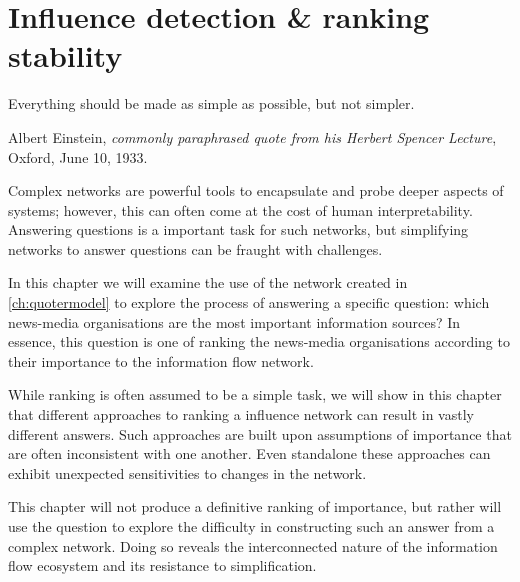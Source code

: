 \chapter{Influence detection \& ranking stability }\label{ch:ranking}


\epigraph{Everything should be made as simple as possible, but not simpler.}{Albert Einstein, {\em commonly paraphrased quote from his Herbert Spencer Lecture}, Oxford, June 10, 1933.}

Complex networks are powerful tools to encapsulate and probe deeper aspects of systems; however, this can often come at the cost of human interpretability. Answering questions is a important task for such networks, but simplifying networks to answer questions can be fraught with challenges.

In this chapter we will examine the use of the network created in \autoref{ch:quotermodel} to explore the process of answering a specific question: which news-media organisations are the most important information sources? In essence, this question is one of ranking the news-media organisations according to their importance to the information flow network. 

While ranking is often assumed to be a simple task, we will show in this chapter that different approaches to ranking a influence network can result in vastly different answers. Such approaches are built upon assumptions of importance that are often inconsistent with one another. Even standalone these approaches can exhibit unexpected sensitivities to changes in the network.

This chapter will not produce a definitive ranking of importance, but rather will use the question to explore the difficulty in constructing such an answer from a complex network. Doing so reveals the interconnected nature of the information flow ecosystem and its resistance to simplification.



